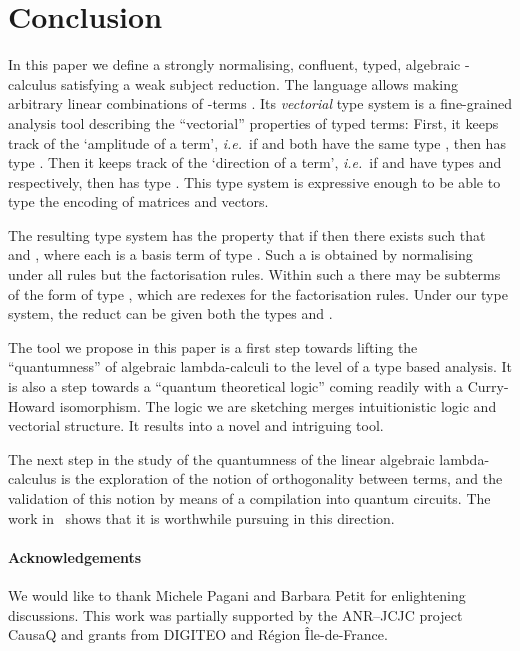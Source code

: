 \documentclass[colorlinks=true,linkcolor=black,urlcolor=black,citecolor=blue,submission,copyright,creativecommons]{eptcs}
\newcommand{\ie}{\emph{i.e.}~}
\begin{document}
\section{Conclusion} \label{sec:conclusion}
In this paper we define a strongly normalising, confluent,
typed,
algebraic -calculus satisfying a weak subject reduction. The
language allows making arbitrary linear combinations of
-terms . Its {\em
  vectorial} type system is a fine-grained analysis tool describing the
``vectorial'' properties of typed terms: First, it keeps track of the
`amplitude of a term', \ie if  and  both have the same
type , then  has type
. Then it keeps track of the `direction of a
term', \ie if  and  have types  and 
respectively, then  has type
. This type system is expressive enough to be able to
type the encoding of matrices and vectors.

The resulting type system has the property that if  then there exists  such that
 and , where
each  is a basis term of type . Such a  is
obtained by normalising  under all rules but the factorisation
rules. Within such a  there may be subterms of the form
 of type
, which are redexes for the
factorisation rules. Under our type system, the reduct
 can be given both the types
 and .

The tool we propose in this paper is a first step towards lifting the ``quantumness'' of algebraic lambda-calculi to the level of a type based analysis. It is also a step
towards a ``quantum theoretical logic'' coming readily with a Curry-Howard
isomorphism. The logic we are sketching merges intuitionistic logic
and vectorial structure. It results into a novel and intriguing tool.

The next step in the study of the quantumness of the linear algebraic
lambda-calculus is the exploration of the notion of orthogonality
between terms, and the validation of this notion by means of a compilation
into quantum circuits. The work in~\cite{ValironQPL10} shows
that it is worthwhile pursuing in this direction.

\paragraph{Acknowledgements}
We would like to thank 
Michele Pagani
and
Barbara Petit
for enlightening discussions.
This work was partially supported by the ANR--JCJC project CausaQ and grants from DIGITEO and Région \^Ile-de-France.
\end{document}
